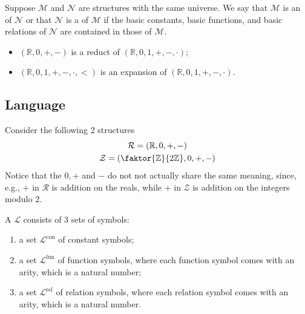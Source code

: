 \documentclass[notoc,notitlepage]{tufte-book}
\DeclareMathOperator{\con}{con}
\DeclareMathOperator{\fun}{fun}
\DeclareMathOperator{\rel}{rel}
\begin{document}
\begin{defn}\label{defn:expansion_n_reduct}
  Suppose $\mathcal{M}$ and $\mathcal{N}$ are structures with the same universe. We say that $\mathcal{M}$ is an  of $\mathcal{N}$ or that $\mathcal{N}$ is a  of $\mathcal{M}$ if the basic constants, basic functions, and basic relations of $\mathcal{N}$ are contained in those of $\mathcal{M}$.
\end{defn}

\begin{eg}
  \begin{itemize}
    \item $(\mathbb{R}, 0, +, -)$ is a reduct of $(\mathbb{R}, 0, 1, +, -, \cdot)$;
    \item $(\mathbb{R}, 0, 1, +, -, \cdot, <)$ is an expansion of $(\mathbb{R}, 0, 1, +, -, \cdot)$.
  \end{itemize}
\end{eg}


\subsection{Language}%
\label{sub:language}

\begin{eg}
  Consider the following 2 structures
  \begin{gather*}
    \mathcal{R} = ( \mathbb{R}, 0, +, - ) \\
    \mathcal{Z} = \left( \faktor{\mathbb{Z}}{2 \mathbb{Z}}, 0, +, - \right)
  \end{gather*}
  Notice that the $0, +$ and $-$ do not not actually share the same meaning, since, e.g., $+$ in $\mathcal{R}$ is addition on the reals, while $+$ in $\mathcal{Z}$ is addition on the integers modulo $2$.
\end{eg}

\begin{defn}[Language]\label{defn:language}
  A  $\mathcal{L}$ consists of $3$ sets of symbols:
  \begin{enumerate}
    \item a set $\mathcal{L}^{\con}$ of constant symbols;
    \item a set $\mathcal{L}^{\fun}$ of function symbols, where each function symbol comes with an arity, which is a natural number;
    \item a set $\mathcal{L}^{\rel}$ of relation symbols, where each relation symbol comes with an arity, which is a natural number.
  \end{enumerate}
\end{defn}
\end{document}
